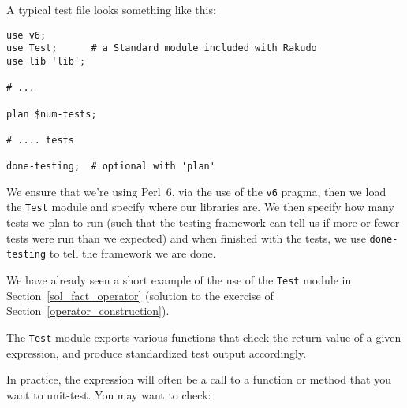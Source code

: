 A typical test file looks something like this:

\begin{verbatim}
use v6;
use Test;      # a Standard module included with Rakudo
use lib 'lib';

# ...

plan $num-tests;

# .... tests

done-testing;  # optional with 'plan'
\end{verbatim}

We ensure that we're using Perl~6, via the use of the \verb'v6' 
pragma, then we load the \verb'Test' module and specify where 
our libraries are. We then specify how many tests we plan 
to run (such that the testing framework can tell us 
if more or fewer tests were run than we expected) 
and when finished with the tests, we use {\tt done-testing} 
to tell the framework we are done.

We have already seen a short example of the use of the 
\verb'Test' module in Section~\ref{sol_fact_operator} 
(solution to the exercise of 
Section~\ref{operator_construction}).

The \verb'Test' module exports various functions that 
check the return value of a given expression, and produce 
standardized test output accordingly.

In practice, the expression will often be a call to a function 
or method that you want to unit-test. You may want to check:

